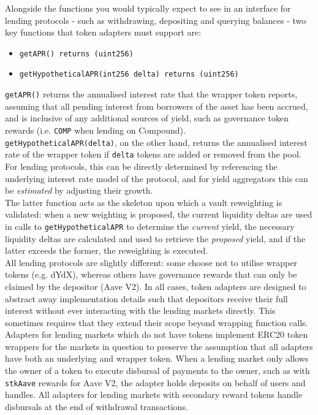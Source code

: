 \documentclass{article}
\begin{document}
\noindent
Alongside the functions you would typically expect to see in an interface for lending protocols - such as withdrawing, depositing and querying balances - two key functions that token adapters must support are:

\begin{itemize}
    \item \texttt{getAPR() returns (uint256)}
    \item \texttt{getHypotheticalAPR(int256 delta) returns (uint256)}
\end{itemize}

\noindent
\texttt{getAPR()} returns the annualised interest rate that the wrapper token reports, assuming that all pending interest from borrowers of the asset has been accrued, and is inclusive of any additional sources of yield, such as governance token rewards (i.e. \texttt{COMP} when lending on Compound).\\

\noindent
\texttt{getHypotheticalAPR(delta)}, on the other hand, returns the annualised interest rate of the wrapper token if \texttt{delta} tokens are added or removed from the pool. For lending protocols, this can be directly determined by referencing the underlying interest rate model of the protocol, and for yield aggregators this can be \textit{estimated} by adjusting their growth.\\

\noindent
The latter function acts as the skeleton upon which a vault reweighting is validated: when a new weighting is proposed, the current liquidity deltas are used in calls to \texttt{getHypotheticalAPR} to determine the \textit{current} yield, the necessary liquidity deltas are calculated and used to retrieve the \textit{proposed} yield, and if the latter exceeds the former, the reweighting is executed.\\

\noindent
All lending protocols are slightly different: some choose not to utilise wrapper tokens (e.g. dYdX), whereas others have governance rewards that can only be claimed by the depositor (Aave V2). In all cases, token adapters are designed to abstract away implementation details such that depositors receive their full interest without ever interacting with the lending markets directly. This sometimes requires that they extend their scope beyond wrapping function calls.\\

\noindent
Adapters for lending markets which do not have tokens implement ERC20 token wrappers for the markets in question to preserve the assumption that all adapters have both an underlying and wrapper token. When a lending market only allows the owner of a token to execute disbursal of payments to the owner, such as with \texttt{stkAave} rewards for Aave V2, the adapter holds deposits on behalf of users and handles. All adapters for lending markets with secondary reward tokens handle disbursals at the end of withdrawal transactions.\\
\end{document}
